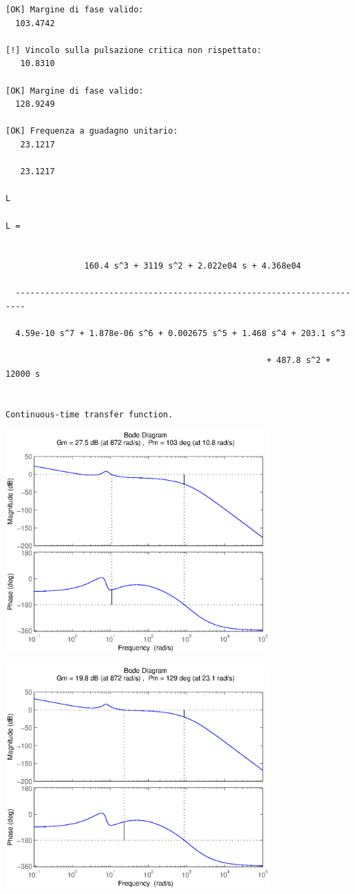 \documentclass{article}
\begin{document}
        \color{lightgray} \begin{verbatim}[OK] Margine di fase valido: 
  103.4742

[!] Vincolo sulla pulsazione critica non rispettato: 
   10.8310

[OK] Margine di fase valido: 
  128.9249

[OK] Frequenza a guadagno unitario: 
   23.1217

   23.1217

L

L =
 
                                                            
                160.4 s^3 + 3119 s^2 + 2.022e04 s + 4.368e04
                                                            
  ------------------------------------------------------------------------
                                                                          
  4.59e-10 s^7 + 1.878e-06 s^6 + 0.002675 s^5 + 1.468 s^4 + 203.1 s^3     
                                                                          
                                                     + 487.8 s^2 + 12000 s
                                                                          
 
Continuous-time transfer function.

\end{verbatim} \color{black}
    
\includegraphics [width=4in]{prog6RADICI_07.eps}

\includegraphics [width=4in]{prog6RADICI_08.eps}
\end{document}

